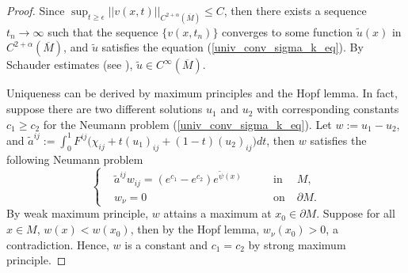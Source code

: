 \documentclass[12pt]{amsart}
\theoremstyle{definition}
\theoremstyle{remark}
\numberwithin{equation}{section}
\begin{document}
\begin{proof}
	Since $\sup_{t\geq\epsilon}||v(x, t)||_{C^{2+\alpha} (\overline{M})} \leq C$, then there exists a sequence $t_n \rightarrow \infty$ such that the sequence $\{v(x, t_n)\}$ converges to some function $\tilde{u}(x)$ in $C^{2+\alpha}(\overline{M})$, and $\tilde{u}$ satisfies the equation (\ref{univ_conv_sigma_k_eq}).
	By Schauder estimates (see \cite{Lieberman13}), $\tilde{u} \in C^{\infty}(\overline{M})$.
	
	Uniqueness can be derived by maximum principles and the Hopf lemma. In fact, suppose there are two different solutions $u_1$ and $u_2$ with corresponding constants $c_1 \geq c_2$ for the Neumann problem (\ref{univ_conv_sigma_k_eq}). Let $w := u_1 - u_2$, and $\tilde{a}^{ij} := \int^1_0 F^{ij}\Big( \chi_{ij} + t (u_1)_{ij} + (1-t) (u_2)_{ij}\Big) dt$, then $w$ satisfies the following Neumann problem
	\begin{equation}
	\left\{
	\begin{aligned}
	&\tilde{a}^{ij}w_{ij} = (e^{c_1} - e^{c_2}) e^{\tilde{\psi}(x)} \qquad &\text{in}&\; M, \\ 
	&w_\nu = 0 \qquad &\text{on}& \; \partial M.  
	\end{aligned}
	\right.
	\end{equation}
	By weak maximum principle, $w$ attains a maximum at $x_0 \in \partial M$. Suppose for all $x\in M$, $w(x) < w(x_0)$, then by the Hopf lemma, $w_\nu (x_0) > 0$, a contradiction. Hence, $w$ is a constant and $c_1 = c_2$ by strong maximum principle.
\end{proof}
\end{document}
